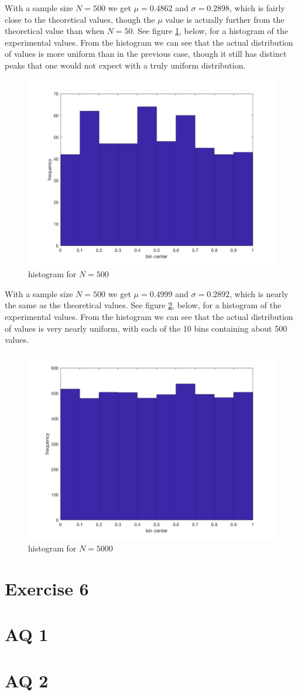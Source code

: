 \documentclass[11pt]{article}
\begin{document}
With a sample size $N=500$ we get $\mu=0.4862$ and $\sigma=0.2898$, which is fairly close to the theoretical values, though the $\mu$ value is actually further from the theoretical value than when $N=50$. See figure \ref{5_plot2}, below, for a histogram of the experimental values. From the histogram we can see that the actual distribution of values is more uniform than in the previous case, though it still has distinct peaks that one would not expect with a truly uniform distribution.

\begin{figure}[h!]
	\centering
	\includegraphics[width=0.6\linewidth]{5_plot2.png}
	\caption{histogram for $N=500$}
	\label{5_plot2}
\end{figure}

With a sample size $N=500$ we get $\mu=0.4999$ and $\sigma=0.2892$, which is nearly the same as the theoretical values. See figure \ref{5_plot3}, below, for a histogram of the experimental values. From the histogram we can see that the actual distribution of values is very nearly uniform, with each of the 10 bins containing about 500 values.

\begin{figure}[h!]
	\centering
	\includegraphics[width=0.6\linewidth]{5_plot3.png}
	\caption{histogram for $N=5000$}
	\label{5_plot3}
\end{figure}

\section*{Exercise 6}

\section*{AQ 1}

\section*{AQ 2}
\end{document}
